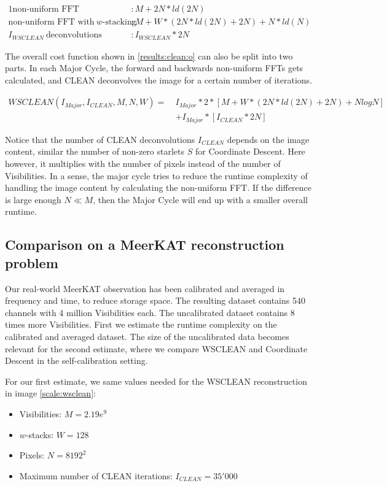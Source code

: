 \begin{alignat*}{1}
	\text{non-uniform FFT} &: M + 2N*ld(2N)\\
	\text{non-uniform FFT with} \:w\text{-stacking} &:M + W*(2N*ld(2N) + 2N) + N*ld(N)\\
	I_{WSCLEAN}\: \text{deconvolutions} &: I_{WSCLEAN}*2N
\end{alignat*}

The overall cost function shown in \eqref{results:clean:o} can also be split into two parts. In each Major Cycle, the forward and backwards non-uniform FFTs gets calculated, and CLEAN deconvolves the image for a certain number of iterations.

\begin{equation}\label{results:clean:o}
\begin{aligned}
 WSCLEAN(I_{Major}, I_{CLEAN}, M, N,  W) =\: &I_{Major} * 2 * [M + W*(2N*ld(2N) + 2N) + N log N]\\
	&+ I_{Major} * [I_{CLEAN}*2N]
\end{aligned}
\end{equation}

Notice that the number of CLEAN deconvolutions $I_{CLEAN}$ depends on the image content, similar the number of non-zero starlets $S$ for Coordinate Descent. Here however, it multiplies with the number of pixels instead of the number of Visibilities. In a sense, the major cycle tries to reduce the runtime complexity of handling the image content by calculating the non-uniform FFT. If the difference is large enough $N \ll M$, then the Major Cycle will end up with a smaller overall runtime.


\subsection{Comparison on a MeerKAT reconstruction problem}
Our real-world MeerKAT observation has been calibrated and averaged in frequency and time, to reduce storage space. The resulting dataset contains 540 channels with 4 million Visibilities each. The uncalibrated dataset contains 8 times more Visibilities. First we estimate the runtime complexity on the calibrated and averaged dataset. The size of the uncalibrated data becomes relevant for the second estimate, where we compare WSCLEAN and Coordinate Descent in the self-calibration setting.

For our first estimate, we same values needed for the WSCLEAN reconstruction in image \ref{scale:wsclean}:
\begin{itemize}
	\item Visibilities: $M=2.19e^9$
	\item $w$-stacks: $W = 128$
	\item Pixels: $N = 8192^2$
	\item Maximum number of CLEAN iterations: $I_{CLEAN} = 35'000$
\end{itemize}

